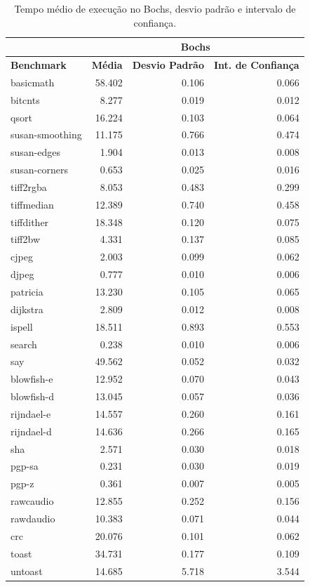 \documentclass[11pt,twoside]{article}
\begin{document}
\begin{table}
 \caption{Tempo médio de execução no Bochs, desvio padrão e intervalo de confiança.}
 \begin{center}
 \begin{tabular}{|l|r|r|r|}
   \cline{2-4}
   \multicolumn{1}{c|}{}& \multicolumn{3}{|c|}{Bochs} \\ \hline
   \bf{Benchmark} & \bf{Média} & \bf{Desvio Padrão} & \bf{Int. de Confiança} \\ \hline
   basicmath & 58.402 & 0.106 & 0.066\\ \hline 
   bitcnts & 8.277 & 0.019 & 0.012\\ \hline 
   qsort & 16.224 & 0.103 & 0.064\\ \hline 
   susan-smoothing & 11.175 & 0.766 & 0.474\\ \hline 
   susan-edges & 1.904 & 0.013 & 0.008\\ \hline 
   susan-corners & 0.653 & 0.025 & 0.016\\ \hline 
   tiff2rgba & 8.053 & 0.483 & 0.299\\ \hline 
   tiffmedian & 12.389 & 0.740 & 0.458\\ \hline 
   tiffdither & 18.348 & 0.120 & 0.075\\ \hline 
   tiff2bw & 4.331 & 0.137 & 0.085\\ \hline 
   cjpeg & 2.003 & 0.099 & 0.062\\ \hline 
   djpeg & 0.777 & 0.010 & 0.006\\ \hline 
   patricia & 13.230 & 0.105 & 0.065\\ \hline 
   dijkstra & 2.809 & 0.012 & 0.008\\ \hline 
   ispell & 18.511 & 0.893 & 0.553\\ \hline 
   search & 0.238 & 0.010 & 0.006\\ \hline 
   say & 49.562 & 0.052 & 0.032\\ \hline 
   blowfish-e & 12.952 & 0.070 & 0.043\\ \hline 
   blowfish-d & 13.045 & 0.057 & 0.036\\ \hline 
   rijndael-e & 14.557 & 0.260 & 0.161\\ \hline 
   rijndael-d & 14.636 & 0.266 & 0.165\\ \hline 
   sha & 2.571 & 0.030 & 0.018\\ \hline 
   pgp-sa & 0.231 & 0.030 & 0.019\\ \hline 
   pgp-z & 0.361 & 0.007 & 0.005\\ \hline 
   rawcaudio & 12.855 & 0.252 & 0.156\\ \hline 
   rawdaudio & 10.383 & 0.071 & 0.044\\ \hline 
   crc & 20.076 & 0.101 & 0.062\\ \hline 
   toast & 34.731 & 0.177 & 0.109\\ \hline 
   untoast & 14.685 & 5.718 & 3.544\\
   \hline
 \end{tabular}
 \label{tab:tempos_bochs}
 \end{center}
\end{table}
\end{document}
